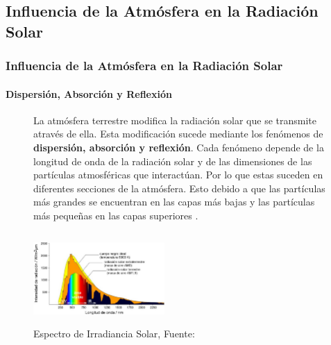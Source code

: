 \documentclass{beamer}
\begin{document}
\subsection{Influencia de la Atmósfera en la Radiación Solar}
\begin{frame}
   \frametitle{Influencia de la Atmósfera en la Radiación Solar}
   \framesubtitle{Dispersión, Absorción y Reflexión}
   \begin{figure}
      \begin{minipage}{0.4\textwidth}
         \scriptsize
         La atmósfera terrestre modifica la radiación solar que se transmite através de ella. Esta modificación sucede mediante los fenómenos de \textbf{dispersión, absorción
         y reflexión}. Cada fenómeno depende de la longitud de onda de la radiación solar y de las dimensiones de las partículas atmosféricas que interactúan. Por
         lo que estas suceden en diferentes secciones de la atmósfera. Esto debido a que las partículas más grandes se encuentran en las capas más bajas y las partículas
         más pequeñas en las capas superiores \cite{scatter,spectral_rad}.
      \end{minipage}
      \hspace{0.7cm}
      \begin{minipage}{0.5\textwidth}
         \includegraphics[height=3.5cm,width=5.0cm]{atmosfera}
         \caption{\tiny Espectro de Irradiancia Solar, Fuente: }
      \end{minipage}
    \end{figure}
\end{frame}

\end{document}
